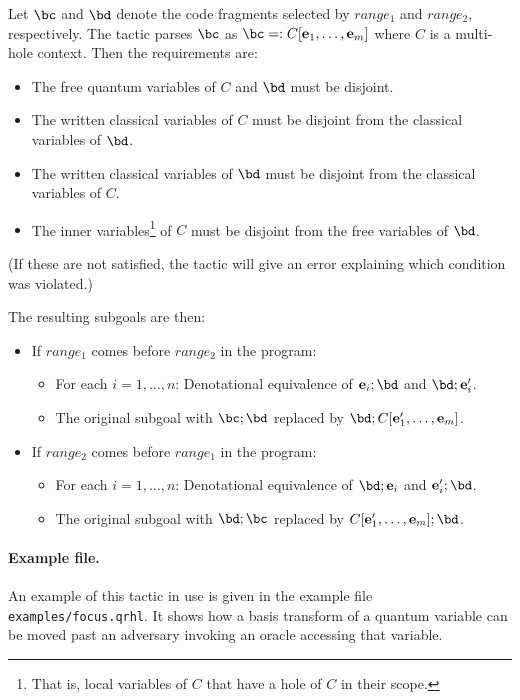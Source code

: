 \documentclass{article}
\begin{document}
Let $\bc$ and $\bd$ denote the code fragments selected by $\mathit{range_1}$ and $\mathit{range_2}$, respectively.
The tactic parses $\bc$ as $\bc=:C[\be_1,\dots,\be_m]$ where $C$ is a multi-hole context. Then the requirements are:
\begin{itemize}
\item The free quantum variables of $C$ and $\bd$ must be disjoint.
\item The written classical variables of $C$ must be disjoint from the classical variables of $\bd$.
\item The written classical variables of $\bd$ must be disjoint from the classical variables of $C$.
\item The inner variables\footnote{That is, local variables of $C$ that have a hole of $C$ in their scope.} of $C$ must be disjoint from the free variables of $\bd$.
\end{itemize}
(If these are not satisfied, the tactic will give an error explaining which condition was violated.)

The resulting subgoals are then:
\begin{itemize}
\item If $\mathit{range_1}$ comes before $\mathit{range_2}$ in the program:
  \begin{itemize}
  \item For each $i=1,\dots,n$: Denotational equivalence of  ${\be_i;\bd}$ and $\bd;\be_i'$.
  \item The original subgoal with $\bc;\bd$ replaced by $\bd;C[\be_1',\dots,\be_m]$.
  \end{itemize}
\item If $\mathit{range_2}$ comes before $\mathit{range_1}$ in the program:
  \begin{itemize}
  \item For each $i=1,\dots,n$: Denotational equivalence of $\bd;\be_i$ and ${\be_i';\bd}$.
  \item The original subgoal with $\bd;\bc$ replaced by $C[\be_1',\dots,\be_m];\bd$.
  \end{itemize}
\end{itemize}


\paragraph{Example file.} An example of this tactic in use is given in the example file \texttt{examples/focus.qrhl}.
It shows how a basis transform of a quantum variable can be moved past an adversary invoking an oracle accessing that variable.
\end{document}
